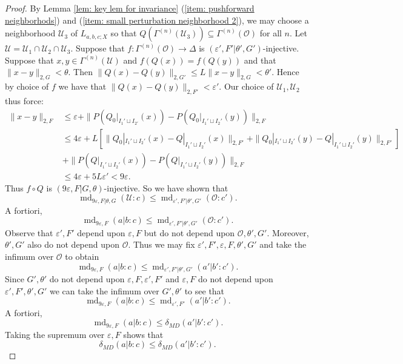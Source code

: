\documentclass[10pt]{amsart}
\theoremstyle{definition}
\numberwithin{equation}{section}
\DeclareMathOperator{\md}{md}
\begin{document}
\begin{proof}
By Lemma \ref{lem: key lem for invariance} (\ref{item: pushforward neighborhods}) and  (\ref{item: small perturbation neighborhood 2}), we may choose a neighborhood $\mathcal{U}_{3}$ of $L_{a,b,c;X}$ so that $Q(\Gamma^{(n)}(\mathcal{U}_{3}))\subseteq \Gamma^{(n)}(\mathcal{O})$ for all $n$. Let $\mathcal{U}=\mathcal{U}_{1}\cap \mathcal{U}_{2}\cap \mathcal{U}_{3}$. 
Suppose that $f\colon \Gamma^{(n)}(\mathcal{O})\to \Delta$ is $(\varepsilon',F'|\theta',G')$-injective. 
Suppose that $x,y\in \Gamma^{(n)}(\mathcal{U})$ and $f(Q(x))=f(Q(y))$ and that $\|x-y\|_{2,G}<\theta$. Then $\|Q(x)-Q(y)\|_{2,G'}\leq L\|x-y\|_{2,G}<\theta'$. Hence by choice of $f$ we have that $\|Q(x)-Q(y)\|_{2,F'}<\varepsilon'$. Our choice of $\mathcal{U}_{1},\mathcal{U}_{2}$ thus force:
\begin{align*}
\|x-y\|_{2,F}&\leq \varepsilon+\|P(Q_{0}|_{I_{1}'\sqcup I_{2'}}(x))-P(Q_{0}|_{I_{1}'\sqcup I_{2}'}(y))\|_{2,F}\\
&\leq 4\varepsilon+L\left[\|Q_{0}|_{I_{1}'\sqcup I_{2}'}(x)-Q|_{I_{1}'\sqcup I_{2}'}(x)\|_{2,F'}+\|Q_{0}|_{I_{1}'\sqcup I_{2}'}(y)-Q|_{I_{1}'\sqcup I_{2}'}(y)\|_{2,F'} \right]\\
&+\|P(Q|_{I_{1}'\sqcup I_{2}'}(x))-P(Q|_{I_{1}'\sqcup I_{2}'}(y))\|_{2,F}\\
&\leq 4\varepsilon+5L\varepsilon'<9\varepsilon.    
\end{align*}
Thus $f\circ Q$ is $(9\varepsilon,F|G,\theta)$-injective. So we have shown that 
\[\md_{9\varepsilon,F|\theta,G}(\mathcal{U}:c)\leq \md_{\varepsilon',F'|\theta',G'}(\mathcal{O}:c').\]
A fortiori,
\[\md_{9\varepsilon,F}(a|b:c)\leq \md_{\varepsilon',F'|\theta',G'}(\mathcal{O}:c').\]
Observe that $\varepsilon',F'$ depend upon $\varepsilon,F$ but do not depend upon $\mathcal{O},\theta',G'$. Moreover, $\theta',G'$ also do not depend upon $\mathcal{O}$. Thus we may fix $\varepsilon',F',\varepsilon,F,\theta',G'$ and take the infimum over $\mathcal{O}$ to obtain
\[\md_{9\varepsilon,F}(a|b:c)\leq \md_{\varepsilon',F'|\theta',G'}(a'|b':c').\]
Since $G',\theta'$ do not depend upon $\varepsilon,F,\varepsilon',F'$ and $\varepsilon,F$ do not depend upon $\varepsilon',F',\theta',G'$ we can take the infimum over $G',\theta'$ to see  that
\[\md_{9\varepsilon,F}(a|b:c)\leq \md_{\varepsilon',F'}(a'|b':c').\]
A fortiori,
\[\md_{9\varepsilon,F}(a|b:c)\leq \delta_{MD}(a'|b':c').\]
Taking the supremum over $\varepsilon,F$ shows that 
\[\delta_{MD}(a|b:c)\leq \delta_{MD}(a'|b':c').\]






\end{proof}
\end{document}
